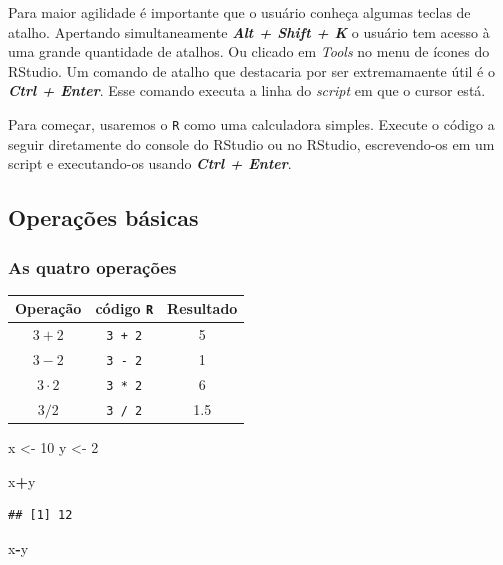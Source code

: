 \documentclass[
]{book}
\newenvironment{Shaded}{\begin{snugshade}}{\end{snugshade}}
\newcommand{\DecValTok}[1]{\textcolor[rgb]{0.00,0.00,0.81}{#1}}
\newcommand{\NormalTok}[1]{#1}
\newcommand{\OperatorTok}[1]{\textcolor[rgb]{0.81,0.36,0.00}{\textbf{#1}}}
\newcommand{\StringTok}[1]{\textcolor[rgb]{0.31,0.60,0.02}{#1}}
\theoremstyle{definition}
\theoremstyle{definition}
\theoremstyle{definition}
\theoremstyle{remark}
\begin{document}
Para maior agilidade é importante que o usuário conheça algumas teclas de atalho. Apertando simultaneamente \textbf{\emph{Alt + Shift + K}} o usuário tem acesso à uma grande quantidade de atalhos. Ou clicado em \emph{Tools} no menu de ícones do RStudio.
Um comando de atalho que destacaria por ser extremamaente útil é o \textbf{\emph{Ctrl + Enter}}. Esse comando executa a linha do \emph{script} em que o cursor está.

Para começar, usaremos o \texttt{R} como uma calculadora simples. Execute o código a seguir diretamente do console do RStudio ou no RStudio, escrevendo-os em um script e executando-os usando \textbf{\emph{Ctrl + Enter}}.

\hypertarget{operauxe7uxf5es-buxe1sicas}{%
\subsection{Operações básicas}\label{operauxe7uxf5es-buxe1sicas}}

\hypertarget{as-quatro-operauxe7uxf5es}{%
\subsubsection{As quatro operações}\label{as-quatro-operauxe7uxf5es}}

\begin{longtable}[]{@{}ccc@{}}
\toprule
Operação & código \texttt{R} & Resultado\tabularnewline
\midrule
\endhead
\(3 + 2\) & \texttt{3\ +\ 2} & 5\tabularnewline
\(3 - 2\) & \texttt{3\ -\ 2} & 1\tabularnewline
\(3 \cdot2\) & \texttt{3\ *\ 2} & 6\tabularnewline
\(3 / 2\) & \texttt{3\ /\ 2} & 1.5\tabularnewline
\bottomrule
\end{longtable}

\begin{Shaded}
\begin{Highlighting}[]
\NormalTok{x <-}\StringTok{ }\DecValTok{10}
\NormalTok{y <-}\StringTok{ }\DecValTok{2}

\NormalTok{x}\OperatorTok{+}\NormalTok{y}
\end{Highlighting}
\end{Shaded}

\begin{verbatim}
## [1] 12
\end{verbatim}

\begin{Shaded}
\begin{Highlighting}[]
\NormalTok{x}\OperatorTok{-}\NormalTok{y}
\end{Highlighting}
\end{Shaded}
\end{document}
